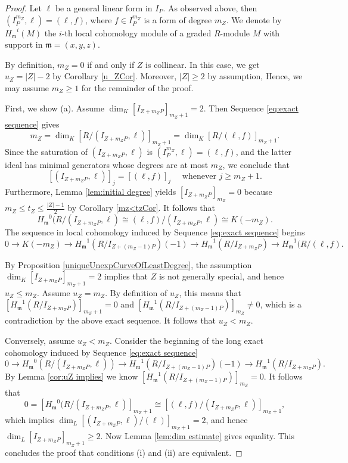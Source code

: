 \documentclass[12pt]{amsart}
\numberwithin{equation}{section}
\theoremstyle{definition}
\begin{document}
\begin{proof} Let $\ell$ be a general linear form in  $I_P$. As observed above, then   $(I_P^{m_Z}, \ell) = (\ell, f)$, where  $f \in I_P^{m_Z}$ is  a form of degree $m_Z$.  We denote by ${H_{\mathfrak m}}^i (M)$ the $i$-th local cohomology module of a graded $R$-module $M$ with support in ${\mathfrak m} = (x, y, z)$. 

By definition,  $m_Z = 0$ if and only if $Z$ is collinear. In this case, we get $u_Z = |Z| - 2$  by Corollary \ref{u_ZCor}. Moreover, $|Z| \ge 2$ by assumption,  Hence, we may assume $m_Z \ge 1$ for the remainder of the proof. 

First, we show (a). Assume $\dim_K [I_{Z + m_Z P}]_{m_Z + 1} = 2$. Then Sequence \eqref{eq:exact sequence} gives 
\[
m_Z = \dim_K [R/(I_{Z + m_Z P}, \ell)]_{m_Z + 1} = \dim_K [R/(\ell, f)]_{m_Z + 1}. 
\]
Since the saturation of $(I_{Z + m_Z P}, \ell)$ is $(I_P^{m_Z}, \ell) = (\ell, f)$, and the latter ideal has minimal generators whose degrees are at most $m_Z$, we conclude that 
\[
[(I_{Z + m_Z P}, \ell)]_{j} = [(\ell, f)]_j \quad \text{ whenever } j \ge m_Z + 1. 
\]
Furthermore, Lemma \ref{lem:initial degree} yields   $[I_{Z + m_Z P}]_{m_Z} = 0$ because $m_Z \le t_Z \le \frac{|Z| - 1}{2}$ by Corollary \ref{mz<tzCor}. It follows that 
\[
{H_{\mathfrak m}}^0 (R/(I_{Z + m_Z P}, \ell) \cong (\ell, f)/(I_{Z + m_Z P}, \ell) \cong K (-m_Z). 
\]
The sequence in local cohomology induced by Sequence \eqref{eq:exact sequence} begins 
\[
0 \to K (-m_Z) \to {H_{\mathfrak m}}^1 (R/I_{Z + (m_Z - 1) P}) (-1) \to {H_{\mathfrak m}}^1 (R/I_{Z + m_Z P}) \to {H_{\mathfrak m}}^1 (R/(\ell, f). 
\]

By Proposition \ref{uniqueUnexpCurveOfLeastDegree}, the assumption $\dim_K [I_{Z + m_Z P}]_{m_Z + 1} = 2$ implies  that $Z$ is not generally special, and hence $u_Z \le m_Z$. Assume $u_Z = m_Z$. By definition of $u_Z$, this means that $[{H_{\mathfrak m}}^1 (R/I_{Z + m_Z P})]_{m_Z + 1} = 0$ and $[{H_{\mathfrak m}}^1 (R/I_{Z + (m_Z -1) P})]_{m_Z} \neq 0$, which is a contradiction by the above exact sequence. It follows that $u_Z < m_Z$. 

Conversely, assume $u_Z < m_Z$. Consider the beginning of the long exact cohomology induced by Sequence \eqref{eq:exact sequence} 
\[
0 \to {H_{\mathfrak m}}^0 (R/(I_{Z + m_Z P}, \ell))  \to {H_{\mathfrak m}}^1 (R/I_{Z + (m_Z - 1) P}) (-1) \to {H_{\mathfrak m}}^1 (R/I_{Z + m_Z P}). 
\]
By Lemma \ref{cor:uZ implies} we know $[{H_{\mathfrak m}}^1 (R/I_{Z + (m_Z - 1) P})]_{m_Z} = 0$. It follows that 
\[
0 = [{H_{\mathfrak m}}^0 (R/(I_{Z + m_Z P}, \ell)]_{m_Z + 1}  \cong [(\ell, f)/(I_{Z + m_Z P}, \ell)]_{m_Z + 1}, 
\]
which implies $\dim_L [(I_{Z + m_Z P}, \ell)/(\ell) ]_{m_Z + 1} = 2$, and hence $\dim_L [I_{Z + m_Z P}]_{m_Z + 1} \ge 2$. Now Lemma \ref{lem:dim estimate} gives  equality. This concludes the proof that conditions (i) and (ii) are equivalent. 


\end{proof}
\end{document}
